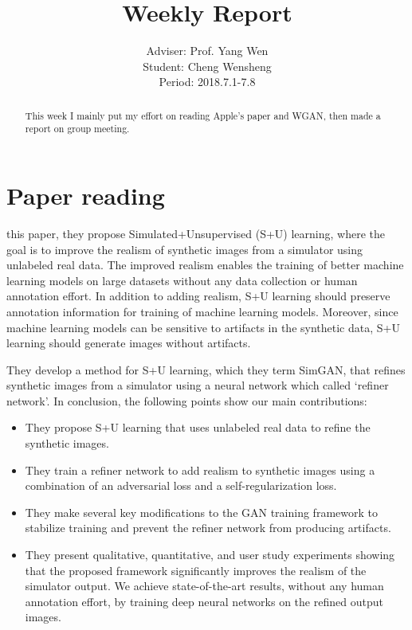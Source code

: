 \documentclass[]{IEEEtran}
\begin{document}
	\title{Weekly Report}
	\author{Adviser: Prof. Yang Wen \\Student: Cheng Wensheng\\ Period: 2018.7.1-7.8
	}
	\maketitle

\begin{abstract}
	This week I mainly put my effort on reading Apple's paper and WGAN, then made a report on group meeting. 
\end{abstract}

\section{Paper reading}
	 this paper, they propose Simulated+Unsupervised
	(S+U) learning, where the goal is to improve the realism
	of synthetic images from a simulator using unlabeled
	real data. The improved realism enables the training
	of better machine learning models on large datasets
	without any data collection or human annotation effort.
	In addition to adding realism, S+U learning should preserve annotation information for training of machine
	learning models. Moreover, since machine learning
	models can be sensitive to artifacts in the synthetic data, S+U learning should generate images without artifacts.

	They develop a method for S+U learning, which they
	term SimGAN, that refines synthetic images from a simulator using a neural network which called ‘refiner
	network’.
	In conclusion, the following points show our main contributions:
	\begin{itemize}
		\item They propose S+U learning that uses unlabeled real data to refine the synthetic images.
		\item They train a refiner network to add realism to synthetic images using a combination of an adversarial
		loss and a self-regularization loss.
		\item They make several key modifications to the GAN
		training framework to stabilize training and prevent
		the refiner network from producing artifacts.
		\item They present qualitative, quantitative, and user study experiments showing that the proposed framework significantly improves the realism of the simulator output. We achieve state-of-the-art results, without any human annotation effort, by training deep neural networks on the refined output images.
	\end{itemize}
	
\end{document}
